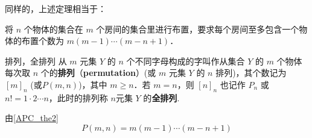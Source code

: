同样的，上述定理相当于：
\begin{theorem}{}\label{APC_the2}
将 $n$ 个物体的集合在 $m$ 个房间的集合里进行布置，要求每个房间至多包含一个物体的布置个数为 $m(m-1)\cdots(m-n+1)$．
\end{theorem}

\begin{definition}{排列，全排列}
从 $m$ 元集 $Y$ 的 $n$ 个不同字母构成的字叫作从集合 $Y$ 的 $m$ 个物体每次取 $n$ 个的\textbf{排列}（\textbf{permutation}）(或 $m$ 元集 $Y$ 的 $n$ 排列)，其个数记为 $[m]_n$ (或$P(m,n)$)，其中 $m\geq n$．若 $m=n$，则 $[n]_n$ 也记作 $P_n$ 或 $n!=1\cdot2\cdots n$，此时的排列称 $n$元集 $Y$ 的\textbf{全排列}.
\end{definition}
由\autoref{APC_the2} 
\begin{equation}
P(m,n)=m(m-1)\cdots(m-n+1)
\end{equation}


